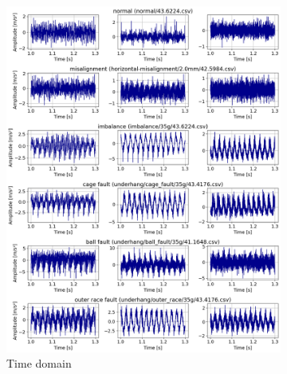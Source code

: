\begin{figure}[h]
    \centering
    \begin{subfigure}[b]{0.49\textwidth}
        \includegraphics[width=\textwidth]{assets/results/eda/mafaulda-TD-A.png}
        \caption{Time domain}
    \end{subfigure}
    \hfill
    \begin{subfigure}[b]{0.49\textwidth}

\end{subfigure}
\end{figure}
